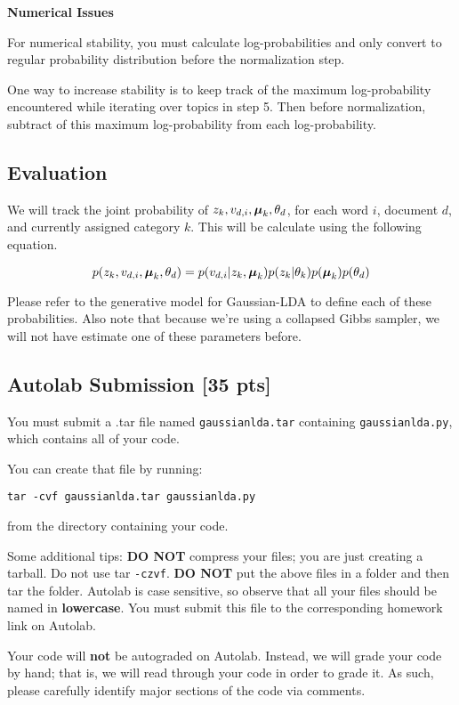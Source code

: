 \documentclass[11pt,addpoints,answers]{exam}
\numberwithin{equation}{section} %
\numberwithin{figure}{section} %
\numberwithin{table}{section} %
\newcommand{\pts}[1]{\textbf{[#1 pts]}}
\begin{document}
\textbf{Numerical Issues}

For numerical stability, you must calculate log-probabilities and only convert to regular probability distribution before the normalization step. 

One way to increase stability is to keep track of the maximum log-probability encountered while iterating over topics in step 5. Then before normalization, subtract of this maximum log-probability from each log-probability. 

\subsection{Evaluation}

We will track the joint probability of $z_k, v_{d, i}, \boldsymbol \mu_k, \theta_d$, for each word $i$, document $d$, and currently assigned category $k$. This will be calculate using the following equation. 

\begin{equation}
\label{likelihood}
    p(z_k, v_{d,i}, \boldsymbol \mu_k, \theta_d) = p(v_{d, i} | z_k, \boldsymbol \mu_k) p(z_k | \theta_k) p(\boldsymbol \mu_k) p(\theta_d) 
\end{equation}

Please refer to the generative model for Gaussian-LDA to define each of these probabilities. Also note that because we're using a collapsed Gibbs sampler, we will not have estimate one of these parameters before.  


\subsection{Autolab Submission \pts{35}}

You must submit a .tar file named \lstinline{gaussianlda.tar} containing \lstinline{gaussianlda.py}, which contains all of your code.

You can create that file by running:
\begin{lstlisting}
tar -cvf gaussianlda.tar gaussianlda.py
\end{lstlisting}
from the directory containing your code.

Some additional tips: {\bf DO NOT} compress your files; you are just
creating a tarball. Do not use tar \texttt{-czvf}.  {\bf DO NOT} put
the above files in a folder and then tar the folder.  Autolab is case
sensitive, so observe that all your files should be named in {\bf
  lowercase}. You must submit this file to the corresponding homework
link on Autolab. 

Your code will \textbf{not} be autograded on Autolab. Instead, we will grade your code by hand; that is, we will read through your code in order to grade it. As such, please carefully identify major sections of the code via comments. 
\end{document}
